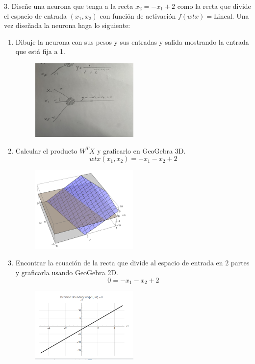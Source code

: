 \documentclass{article}
\begin{document}
\begin{flushleft}
  3. Diseñe una neurona que tenga a la recta $x_2=-x_1+2$ como la recta que divide el espacio de entrada $(x_1,x_2)$ con 
  función de activación $f(wtx)=\text{Lineal}$. Una vez diseñada la neurona haga lo siguiente:
  \begin{enumerate}
    \item Dibuje la neurona con sus pesos y sus entradas y salida mostrando la entrada que está fija a 1.
    \begin{figure}[H]
      \centering
      \includegraphics[width=0.5\textwidth]{linear.jpg}  %
    \end{figure}
    \item Calcular el producto $W^T X$ y graficarlo en GeoGebra 3D.
    \[ wtx(x_1, x_2) = - x_1 - x_2 + 2 \]
    \begin{figure}[H]
      \centering
      \includegraphics[width=0.5\textwidth]{Imagen0.png}  %
    \end{figure}
    \item Encontrar la ecuación de la recta que divide al espacio de entrada en 2 partes y graficarla usando GeoGebra 2D.
    \[ 0 = - x_1 - x_2 + 2 \]
    \begin{figure}[H]
      \centering
      \includegraphics[width=0.5\textwidth]{2_Decision_boundry.PNG}  %

\end{figure}
\end{enumerate}
\end{flushleft}
\end{document}
